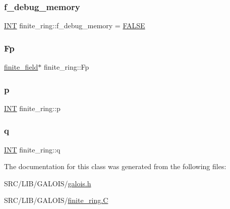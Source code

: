 \subsubsection{\texorpdfstring{f\+\_\+debug\+\_\+memory}{f\_debug\_memory}}
{\footnotesize\ttfamily \mbox{\hyperlink{galois_8h_a09fddde158a3a20bd2dcadb609de11dc}{I\+NT}} finite\+\_\+ring\+::f\+\_\+debug\+\_\+memory = \mbox{\hyperlink{nauty_8h_aa93f0eb578d23995850d61f7d61c55c1}{F\+A\+L\+SE}}\hspace{0.3cm}{\ttfamily [static]}}

\mbox{\label{classfinite__ring_aa586a1bbe1cbf4c20a2f2b8d530c3352}} 
\subsubsection{\texorpdfstring{Fp}{Fp}}
{\footnotesize\ttfamily \mbox{\hyperlink{classfinite__field}{finite\+\_\+field}}$\ast$ finite\+\_\+ring\+::\+Fp}

\mbox{\label{classfinite__ring_a8ba25b50394b4ac5687dfb2fd3b7cd23}} 
\subsubsection{\texorpdfstring{p}{p}}
{\footnotesize\ttfamily \mbox{\hyperlink{galois_8h_a09fddde158a3a20bd2dcadb609de11dc}{I\+NT}} finite\+\_\+ring\+::p}

\mbox{\label{classfinite__ring_a3c2ea6f3a5c83681ce5284ac2860b576}} 
\subsubsection{\texorpdfstring{q}{q}}
{\footnotesize\ttfamily \mbox{\hyperlink{galois_8h_a09fddde158a3a20bd2dcadb609de11dc}{I\+NT}} finite\+\_\+ring\+::q}



The documentation for this class was generated from the following files\+:\begin{DoxyCompactItemize}
\item 
S\+R\+C/\+L\+I\+B/\+G\+A\+L\+O\+I\+S/\mbox{\hyperlink{galois_8h}{galois.\+h}}\item 
S\+R\+C/\+L\+I\+B/\+G\+A\+L\+O\+I\+S/\mbox{\hyperlink{finite__ring_8_c}{finite\+\_\+ring.\+C}}\end{DoxyCompactItemize}
